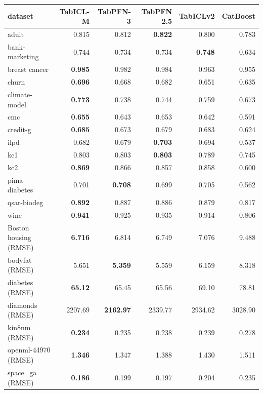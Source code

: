 \begin{tabular}{lrrrrr}
\toprule
dataset & TabICL-M & TabPFN-3 & TabPFN 2.5 & TabICLv2 & CatBoost\\
\midrule
adult & 0.815 & 0.812 & \textbf{0.822} & 0.800 & 0.783\\
bank-marketing & 0.744 & 0.734 & 0.734 & \textbf{0.748} & 0.634\\
breast cancer & \textbf{0.985} & 0.982 & 0.984 & 0.963 & 0.955\\
churn & \textbf{0.696} & 0.668 & 0.682 & 0.651 & 0.635\\
climate-model & \textbf{0.773} & 0.738 & 0.744 & 0.759 & 0.673\\
cmc & \textbf{0.655} & 0.643 & 0.653 & 0.642 & 0.591\\
credit-g & \textbf{0.685} & 0.673 & 0.679 & 0.683 & 0.624\\
ilpd & 0.682 & 0.679 & \textbf{0.703} & 0.694 & 0.537\\
kc1 & 0.803 & 0.803 & \textbf{0.803} & 0.789 & 0.745\\
kc2 & \textbf{0.869} & 0.866 & 0.857 & 0.858 & 0.600\\
pima-diabetes & 0.701 & \textbf{0.708} & 0.699 & 0.705 & 0.562\\
qsar-biodeg & \textbf{0.892} & 0.887 & 0.886 & 0.879 & 0.817\\
wine & \textbf{0.941} & 0.925 & 0.935 & 0.914 & 0.806\\
Boston housing (RMSE) & \textbf{6.716} & 6.814 & 6.749 & 7.076 & 9.488\\
bodyfat (RMSE) & 5.651 & \textbf{5.359} & 5.559 & 6.159 & 8.318\\
diabetes (RMSE) & \textbf{65.12} & 65.45 & 65.56 & 69.10 & 78.81\\
diamonds (RMSE) & 2207.69 & \textbf{2162.97} & 2339.77 & 2934.62 & 3028.90\\
kin8nm (RMSE) & \textbf{0.234} & 0.235 & 0.238 & 0.239 & 0.278\\
openml-44970 (RMSE) & \textbf{1.346} & 1.347 & 1.388 & 1.430 & 1.511\\
space\_ga (RMSE) & \textbf{0.186} & 0.199 & 0.197 & 0.204 & 0.235\\
\bottomrule
\end{tabular}